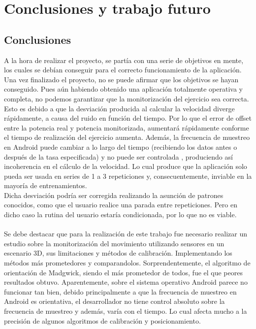 \chapter{Conclusiones y trabajo futuro}

\section*{Conclusiones}

A la hora de realizar el proyecto, se partía con una serie de objetivos en mente, los cuales se debían conseguir para el correcto funcionamiento de la aplicación. Una vez finalizado el proyecto, no se puede afirmar que los objetivos se hayan conseguido. Pues aún habiendo obtenido una aplicación totalmente operativa y completa, no podemos garantizar que la monitorización del ejercicio sea correcta.
\\
Esto es debido a que la desviación producida al calcular la velocidad diverge rápidamente, a causa del ruido en función del tiempo. Por lo que el error de offset entre la potencia real y potencia monitorizada, aumentará rápidamente conforme el tiempo de realización del ejercicio aumenta. Además, la frecuencia de muestreo en Android puede cambiar a lo largo del tiempo (recibiendo los datos antes o después de la tasa especificada) y no puede ser controlada \cite{SensorGoogle}, produciendo así incoherencia en el cálculo de la velocidad. Lo cual produce que la aplicación solo pueda ser usada en series de 1 a 3 repeticiones y, consecuentemente, inviable en la mayoría de entrenamientos.
\\
Dicha desviación podría ser corregida realizando la asunción de patrones conocidos, como que el usuario realice una parada entre repeticiones. Pero en dicho caso la rutina del usuario estaría condicionada, por lo que no es viable.
\\
\\
Se debe destacar que para la realización de este trabajo fue necesario realizar un estudio sobre la monitorización del movimiento utilizando sensores en un escenario 3D, sus limitaciones y métodos de calibración. Implementando los métodos más prometedores y comparandolos. Sorprendentemente, el algoritmo de orientación de Madgwick, siendo el más prometedor de todos, fue el que peores resultados obtuvo. Aparentemente, sobre el sistema operativo Android parece no funcionar tan bien, debido principalmente a que la frecuencia de muestreo en Android es orientativa, el desarrollador no tiene control absoluto sobre la frecuencia de muestreo y además, varía con el tiempo. Lo cual afecta mucho a la precisión de algunos algoritmos de calibración y posicionamiento.

